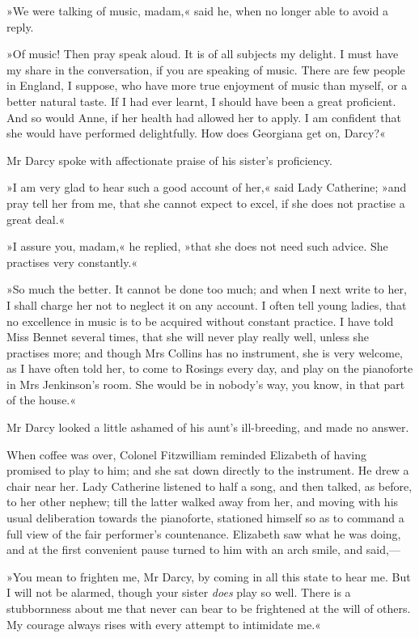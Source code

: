 »We were talking of music, madam,« said he, when no longer able to avoid a reply.

»Of music! Then pray speak aloud. It is of all subjects my delight. I must have my share in the conversation, if you are speaking of music. There are few people in England, I suppose, who have more true enjoyment of music than myself, or a better natural taste. If I had ever learnt, I should have been a great proficient. And so would Anne, if her health had allowed her to apply. I am confident that she would have performed delightfully. How does Georgiana get on, Darcy?«

Mr Darcy spoke with affectionate praise of his sister's proficiency.

»I am very glad to hear such a good account of her,« said Lady Catherine; »and pray tell her from me, that she cannot expect to excel, if she does not practise a great deal.«

»I assure you, madam,« he replied, »that she does not need such advice. She practises very constantly.«

»So much the better. It cannot be done too much; and when I next write to her, I shall charge her not to neglect it on any account. I often tell young ladies, that no excellence in music is to be acquired without constant practice. I have told Miss Bennet several times, that she will never play really well, unless she practises more; and though Mrs Collins has no instrument, she is very welcome, as I have often told her, to come to Rosings every day, and play on the pianoforte in Mrs Jenkinson's room. She would be in nobody's way, you know, in that part of the house.«

Mr Darcy looked a little ashamed of his aunt's ill-breeding, and made no answer.

When coffee was over, Colonel Fitzwilliam reminded Elizabeth of having promised to play to him; and she sat down directly to the instrument. He drew a chair near her. Lady Catherine listened to half a song, and then talked, as before, to her other nephew; till the latter walked away from her, and moving with his usual deliberation towards the pianoforte, stationed himself so as to command a full view of the fair performer's countenance. Elizabeth saw what he was doing, and at the first convenient pause turned to him with an arch smile, and said,—

»You mean to frighten me, Mr Darcy, by coming in all this state to hear me. But I will not be alarmed, though your sister \textit{does} play so well. There is a stubbornness about me that never can bear to be frightened at the will of others. My courage always rises with every attempt to intimidate me.«

